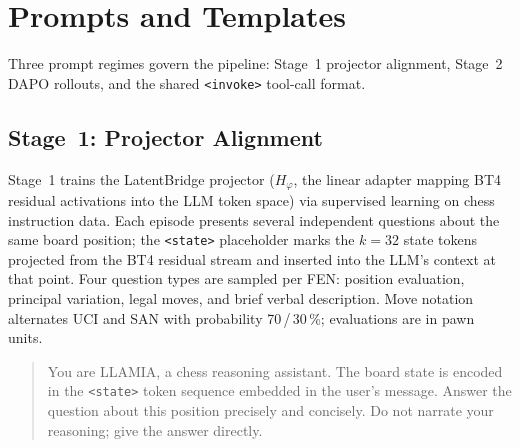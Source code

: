 \section{Prompts and Templates}
\label{sec:app_prompts}

Three prompt regimes govern the pipeline: Stage~1 projector alignment, Stage~2 DAPO
rollouts, and the shared \texttt{<invoke>} tool-call format.

\subsection{Stage~1: Projector Alignment}
\label{sec:app_prompts_stage1}

Stage~1 trains the LatentBridge projector ($H_\varphi$, the linear adapter mapping BT4
residual activations into the LLM token space) via supervised learning on chess
instruction data.
Each episode presents several independent questions about the same board position; the
\texttt{<state>} placeholder marks the $k{=}32$ state tokens projected from the BT4
residual stream and inserted into the LLM's context at that point.
Four question types are sampled per FEN: position evaluation, principal variation, legal
moves, and brief verbal description.
Move notation alternates UCI and SAN with probability 70\,/\,30\,\%; evaluations are in
pawn units.

\begin{tcolorbox}[promptbox,
  title={$\triangleright$\; Stage~1 System Prompt}]
\begin{quote}
You are LLAMIA, a chess reasoning assistant.
The board state is encoded in the \texttt{<state>} token sequence embedded in the
user's message.
Answer the question about this position precisely and concisely.
Do not narrate your reasoning; give the answer directly.
\end{quote}
\end{tcolorbox}

